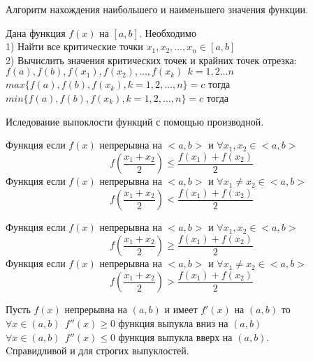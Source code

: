 \begin{title}[\Large]
  Алгоритм нахождения наибольшего и наименьшего значения функции.
\end{title}
Дана функция $f(x)$ на $[a,b]$. Необходимо\\
1) Найти все критические точки $x_1, x_2, \ldots, x_n \in [a, b]$\\
2) Вычислить значения критических точек и крайних точек отрезка:\\
$f(a), f(b), f(x_1), f(x_2), \ldots, f(x_k) ~~ k = 1, 2 \ldots n$\\
$max \{f(a), f(b), f(x_k), k = 1, 2, \ldots, n\} = c $ тогда \\
$min \{f(a), f(b), f(x_k), k = 1, 2, \ldots, n\} = c $ тогда \\

\begin{title}[\Large]
  Иследование выпоклости функций с помощью производной.
\end{title}

\begin{defin}
  Функция  если $f(x)$ непрерывна на $<a,b>$ и
  $\forall x_1, x_2 \in <a,b>$
  \[f(\frac{x_1 + x_2}{2}) \le \frac{f(x_1) + f(x_2)}{2}\]
  Функция  если $f(x)$ непрерывна
  на $<a,b>$ и
  $\forall x_1 \not= x_2 \in <a,b>$
  \[f(\frac{x_1 + x_2}{2}) < \frac{f(x_1) + f(x_2)}{2}\]
\end{defin}

\begin{defin}
  Функция  если $f(x)$ непрерывна на $<a,b>$ и
  $\forall x_1, x_2 \in <a,b>$
  \[f(\frac{x_1 + x_2}{2}) \ge \frac{f(x_1) + f(x_2)}{2}\]
  Функция  если $f(x)$ непрерывна
  на $<a,b>$ и
  $\forall x_1 \not= x_2 \in <a,b>$
  \[f(\frac{x_1 + x_2}{2}) > \frac{f(x_1) + f(x_2)}{2}\]
\end{defin}

\begin{theorem}
  Пусть $f(x)$ непрерывна на $(a,b)$ и имеет $f'(x)$ на $(a,b)$ то\\
  $\forall x \in (a,b) ~~ f''(x) \ge 0$ функция выпукла вниз на $(a,b)$\\
  $\forall x \in (a,b) ~~ f''(x) \le 0$ функция выпукла вверх на $(a,b)$.\\
  Cправидливой и для строгих выпуклостей.
\end{theorem}

